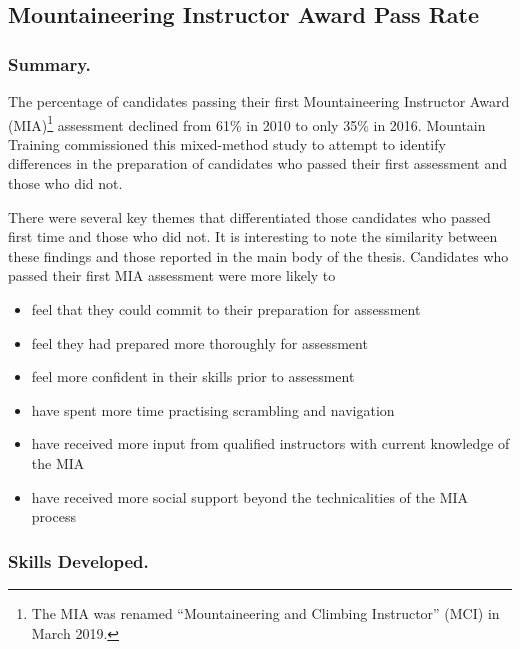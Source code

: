 \documentclass[
  12pt,
  a4paper,
]{book}
\providecommand{\tightlist}{%
  \setlength{\itemsep}{0pt}\setlength{\parskip}{0pt}}
\begin{document}
\hypertarget{mountaineering-instructor-award-pass-rate}{%
\subsection{Mountaineering Instructor Award Pass Rate}\label{mountaineering-instructor-award-pass-rate}}

\hypertarget{summary.}{%
\subsubsection{Summary.}\label{summary.}}

The percentage of candidates passing their first Mountaineering Instructor Award (MIA)\footnote{The MIA was renamed ``Mountaineering and Climbing Instructor'' (MCI) in March 2019.} assessment declined from 61\% in 2010 to only 35\% in 2016. Mountain Training commissioned this mixed-method study to attempt to identify differences in the preparation of candidates who passed their first assessment and those who did not.

There were several key themes that differentiated those candidates who passed first time and those who did not. It is interesting to note the similarity between these findings and those reported in the main body of the thesis. Candidates who passed their first MIA assessment were more likely to

\begin{itemize}
\tightlist
\item
  feel that they could commit to their preparation for assessment
\item
  feel they had prepared more thoroughly for assessment
\item
  feel more confident in their skills prior to assessment
\item
  have spent more time practising scrambling and navigation
\item
  have received more input from qualified instructors with current knowledge of the MIA
\item
  have received more social support beyond the technicalities of the MIA process
\end{itemize}

\hypertarget{skills-developed.}{%
\subsubsection{Skills Developed.}\label{skills-developed.}}
\end{document}
